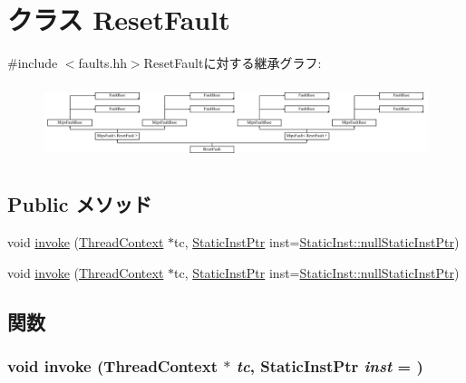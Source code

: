 \hypertarget{classMipsISA_1_1ResetFault}{
\section{クラス ResetFault}
\label{classMipsISA_1_1ResetFault}
}


{\ttfamily \#include $<$faults.hh$>$}ResetFaultに対する継承グラフ:\begin{figure}[H]
\begin{center}
\leavevmode
\includegraphics[height=2.21519cm]{classMipsISA_1_1ResetFault}
\end{center}
\end{figure}
\subsection*{Public メソッド}
\begin{DoxyCompactItemize}
\item 
void \hyperlink{classMipsISA_1_1ResetFault_a2bd783b42262278d41157d428e1f8d6f}{invoke} (\hyperlink{classThreadContext}{ThreadContext} $\ast$tc, \hyperlink{classRefCountingPtr}{StaticInstPtr} inst=\hyperlink{classStaticInst_aa793d9793af735f09096369fb17567b6}{StaticInst::nullStaticInstPtr})
\item 
void \hyperlink{classMipsISA_1_1ResetFault_a2bd783b42262278d41157d428e1f8d6f}{invoke} (\hyperlink{classThreadContext}{ThreadContext} $\ast$tc, \hyperlink{classRefCountingPtr}{StaticInstPtr} inst=\hyperlink{classStaticInst_aa793d9793af735f09096369fb17567b6}{StaticInst::nullStaticInstPtr})
\end{DoxyCompactItemize}


\subsection{関数}
\hypertarget{classMipsISA_1_1ResetFault_a2bd783b42262278d41157d428e1f8d6f}{
\subsubsection[{invoke}]{\setlength{\rightskip}{0pt plus 5cm}void invoke ({\bf ThreadContext} $\ast$ {\em tc}, \/  {\bf StaticInstPtr} {\em inst} = {})}}
\label{classMipsISA_1_1ResetFault_a2bd783b42262278d41157d428e1f8d6f}


